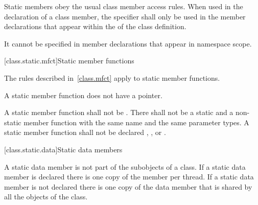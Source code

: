 \pnum
Static members obey the usual class member access rules.
When used in the declaration of a class
member, the  specifier shall only be used in the member
declarations that appear within the  of
the class definition.
\begin{note}
It cannot be specified in member declarations that appear in namespace scope.
\end{note}

[class.static.mfct]{Static member functions}
%

\pnum
\begin{note}
The rules described in~\ref{class.mfct} apply to static member
functions.
\end{note}

\pnum
\begin{note}
A static member function does not have a 
pointer.
\end{note}
A static member function shall not be . There
shall not be a static and a non-static member function with the
same name and the same parameter types. A
static member function shall not be declared ,
, or .

[class.static.data]{Static data members}
%

\pnum
A static data member is not part of the subobjects of a class. If a
static data member is declared  there is one copy of
the member per thread. If a static data member is not declared
 there is one copy of the data member that is shared by all
the objects of the class.

